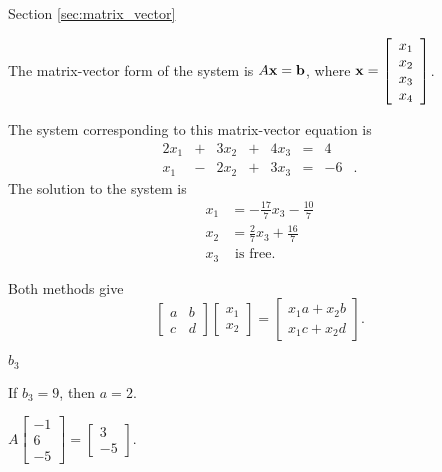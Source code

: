 \begin{multicols}{2}
\oee

\hspace{-0.25in} Section \ref{sec:matrix_vector}

\obe
\item  The matrix-vector form of the system is $A \mathbf{x} = \mathbf{b}$, where $\mathbf{x} = \left[ \begin{array}{c} x_1\\x_2\\x_3\\x_4 \end{array} \right]$. 


\item  The system corresponding to this matrix-vector equation is 
\begin{alignat*}{4}
{2}x_1 	&{}+{} 	&{3}x_2 	&{}+{}	&{4}x_3 		&{}={}	&{}4&{} \\
{}x_1 	&{}-{} 	&{2}x_2	&{}+{}	&{3}x_3 		&{}={}	&{-}6&{.}
\end{alignat*}
The solution to the system is 
\begin{align*}
x_1 &= - \frac{17}{7}x_3 -  \frac{10}{7} \\
x_2 &= \frac{2}{7}x_3 +  \frac{16}{7} \\
x_3 &\text{ is free}.
\end{align*}


\item Both methods give 
\[\left[ \begin{array}{cc} a & b\\ c& d \end{array} \right]\left[ \begin{array}{c} x_1 \\ x_2 \end{array} \right] = \left[ \begin{array}{c} x_1a+x_2b \\ x_1c+x_2d \end{array} \right].\]


\item 
\ba
\item  $b_3$ 

\item If $b_3 = 9$, then $a = 2$. 

\ea


\item $A\left[ \begin{array}{r} -1 \\ 6 \\ -5 \end{array} \right] =  \left[ \begin{array}{r} 3 \\ -5 \end{array} \right]$.




\end{multicols}
